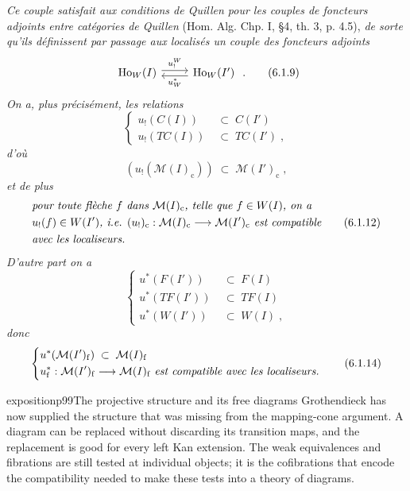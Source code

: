 \begin{itemize}[leftmargin=2.5em]
\textit{Ce couple satisfait aux conditions de Quillen pour les couples de foncteurs adjoints entre catégories de Quillen} (Hom. Alg. Chp. I, §4, th. 3, p. 4.5), \textit{de sorte qu'ils définissent par passage aux localisés un couple des foncteurs adjoints}
\[
\begin{tikzcd}
\mathrm{Ho}_W(I) \arrow[r, shift left, "u_!^{W}"] & \mathrm{Ho}_W(I') \arrow[l, shift left, "u^{*}_{W}"]
\end{tikzcd}
\;.
\tag*{(6.1.9)}
\]
\textit{On a, plus précisément, les relations}
\[
\left\{
\begin{aligned}
u_!(C(I)) \;&\subset\; C(I')\\
u_!(TC(I)) \;&\subset\; TC(I')\;,
\end{aligned}
\right.
\tag*{(6.1.10)}
\]
\textit{d'où}
\[
(u_!(\mathcal{M}(I)_{\mathrm{c}})) \;\subset\; \mathcal{M}(I')_{\mathrm{c}}\;,
\tag*{(6.1.11)}
\]
\textit{et de plus}
\[
\begin{aligned}
&\text{\textit{pour toute flèche $f$ dans $\mathcal{M}(I)_{\mathrm{c}}$, telle que $f \in W(I)$, on a}}\\
&\text{\textit{$u_!(f) \in W(I')$, i.e. $(u_!)_{\mathrm{c}} : \mathcal{M}(I)_{\mathrm{c}} \longrightarrow \mathcal{M}(I')_{\mathrm{c}}$ est compatible}}\\
&\text{\textit{avec les localiseurs.}}
\end{aligned}
\tag*{(6.1.12)}
\]
\textit{D'autre part on a}
\[
\left\{
\begin{aligned}
u^{*}(F(I')) \;&\subset\; F(I)\\
u^{*}(TF(I')) \;&\subset\; TF(I)\\
u^{*}(W(I')) \;&\subset\; W(I)\;,
\end{aligned}
\right.
\tag*{(6.1.13)}
\]
\textit{donc}
\[
\left\{
\begin{aligned}
&u^{*}(\mathcal{M}(I')_{\mathrm{f}}) \;\subset\; \mathcal{M}(I)_{\mathrm{f}}\\
&u^{*}_{\mathrm{f}} : \mathcal{M}(I')_{\mathrm{f}} \longrightarrow \mathcal{M}(I)_{\mathrm{f}} \text{ \textit{est compatible avec les localiseurs.}}
\end{aligned}
\right.
\tag*{(6.1.14)}
\]

\begin{dcomment}{exposition}{p99}{The projective structure and its free diagrams}
Grothendieck has now supplied the structure that was missing from the mapping-cone argument. A diagram can be replaced without discarding its transition maps, and the replacement is good for every left Kan extension. The weak equivalences and fibrations are still tested at individual objects; it is the cofibrations that encode the compatibility needed to make these tests into a theory of diagrams.


\end{dcomment}
\end{itemize}
